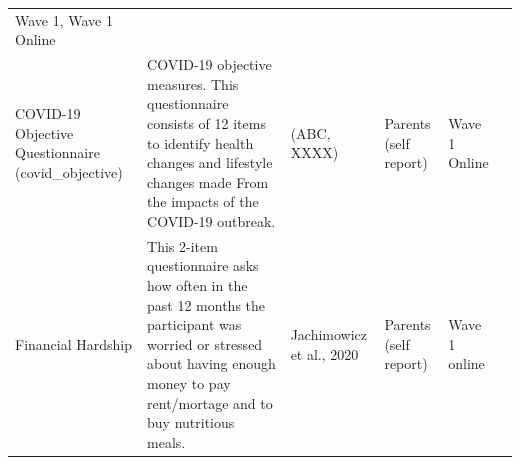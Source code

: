 \documentclass[]{book}
\begin{document}
\begin{longtable}[]{@{}llllll@{}}
\begin{minipage}[t]{0.06\columnwidth}
Wave 1, Wave 1 Online\strut
\end{minipage} & \begin{minipage}[t]{0.10\columnwidth}\raggedright
\strut
\end{minipage}\tabularnewline
\begin{minipage}[t]{0.18\columnwidth}\raggedright
COVID-19 Objective Questionnaire (covid\_objective)\strut
\end{minipage} & \begin{minipage}[t]{0.18\columnwidth}\raggedright
COVID-19 objective measures. This questionnaire consists of 12 items to identify health changes and lifestyle changes made From the impacts of the COVID-19 outbreak.\strut
\end{minipage} & \begin{minipage}[t]{0.15\columnwidth}\raggedright
(ABC, XXXX)\strut
\end{minipage} & \begin{minipage}[t]{0.16\columnwidth}\raggedright
Parents (self report)\strut
\end{minipage} & \begin{minipage}[t]{0.06\columnwidth}\raggedright
Wave 1 Online\strut
\end{minipage} & \begin{minipage}[t]{0.10\columnwidth}\raggedright
\strut
\end{minipage}\tabularnewline
\begin{minipage}[t]{0.18\columnwidth}\raggedright
Financial Hardship\strut
\end{minipage} & \begin{minipage}[t]{0.18\columnwidth}\raggedright
This 2-item questionnaire asks how often in the past 12 months the participant was worried or stressed about having enough money to pay rent/mortage and to buy nutritious meals.\strut
\end{minipage} & \begin{minipage}[t]{0.15\columnwidth}\raggedright
Jachimowicz et al., 2020\strut
\end{minipage} & \begin{minipage}[t]{0.16\columnwidth}\raggedright
Parents (self report)\strut
\end{minipage} & \begin{minipage}[t]{0.06\columnwidth}\raggedright
Wave 1 online\strut
\end{minipage} & \begin{minipage}[t]{0.10\columnwidth}\raggedright
\strut
\end{minipage}\tabularnewline

\end{longtable}
\end{document}
